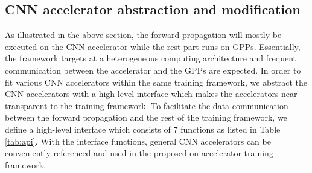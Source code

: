 \subsection{CNN accelerator abstraction and modification}
As illustrated in the above section, the forward propagation will 
mostly be executed on the CNN accelerator while 
the rest part runs on GPPs. Essentially, the framework targets at a 
heterogeneous computing architecture and frequent 
communication between the accelerator and the GPPs are expected. 
In order to fit various CNN accelerators within the same training framework,
we abstract the CNN accelerators with a high-level interface
which makes the accelerators near transparent to the training framework.
To facilitate the data communication between the forward propagation
and the rest of the training framework, we define a high-level
interface which consists of 7 functions as listed in Table \ref{tab:api}.
With the interface functions, general CNN accelerators can be conveniently
referenced and used in the proposed on-accelerator training framework.
